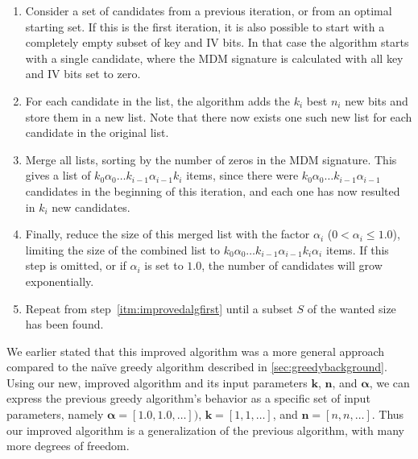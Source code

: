 {\begin{enumerate}
	\item Consider a set of candidates from a previous iteration, or from an optimal starting set. If this is the first iteration, it is also possible to start with a completely empty subset of key and IV bits. In that case the algorithm starts with a single candidate, where the MDM signature is calculated with all key and IV bits set to zero. \label{itm:improvedalgfirst}
	\item For each candidate in the list, the algorithm adds the $k_i$ best $n_i$ new bits and store them in a new list. Note that there now exists one such new list for each candidate in the original list.
	\item Merge all lists, sorting by the number of zeros in the MDM signature. This gives a list of $k_0\alpha_0\ldots k_{i-1} \alpha_{i-1} k_i$ items, since there were $k_0\alpha_0\ldots k_{i-1} \alpha_{i-1}$ candidates in the beginning of this iteration, and each one has now resulted in $k_i$ new candidates.
	\item Finally, reduce the size of this merged list with the factor $\alpha_{i}$ ($0 < \alpha_i \le 1.0$), limiting the size of the combined list to $k_0\alpha_0\ldots k_{i-1} \alpha_{i-1} k_i \alpha_i$ items. If this step is omitted, or if $\alpha_i$ is set to $1.0$, the number of candidates will grow exponentially.
	\item Repeat from step~\ref{itm:improvedalgfirst} until a subset $S$ of the wanted size has been found.
\end{enumerate}

We earlier stated that this improved algorithm was a more general approach compared to the na\"{i}ve greedy algorithm described in \autoref{sec:greedybackground}. Using our new, improved algorithm and its input parameters $\bm{k}$, $\bm{n}$, and $\bm{\alpha}$, we can express the previous greedy algorithm's behavior as a specific set of input parameters, namely $\bm{\alpha} = [1.0, 1.0, \ldots])$, $\bm{k} = [1, 1, \ldots]$, and $\bm{n} = [n, n, \ldots]$. Thus our improved algorithm is a generalization of the previous algorithm, with many more degrees of freedom.

}
